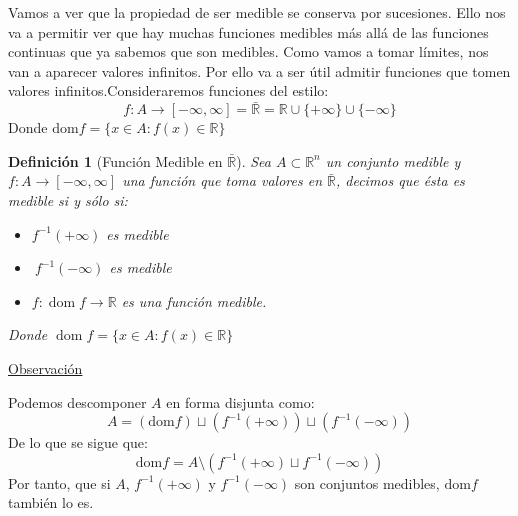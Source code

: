 \documentclass[10pt,a4paper,openright]{book}
\theoremstyle{break}
\newtheorem*{defi}{Definición}
\DeclareMathOperator{\dom}{dom}
\begin{document}
Vamos a ver que la propiedad de ser medible se conserva por sucesiones. Ello nos va a permitir ver que hay muchas funciones medibles
más allá de las funciones continuas que ya sabemos que son medibles.
Como vamos a tomar límites, nos van a aparecer valores infinitos. Por
ello va a ser útil admitir funciones que tomen valores infinitos.Consideraremos funciones del estilo:
$$f: A \rightarrow \left[-\infty, \infty\right] = \bar{\mathbb{R}} = \mathbb{R} \cup \{+\infty\} \cup \{-\infty\}$$
Donde $\mathrm{dom}f = \{x \in A: f\left(x\right) \in \mathbb{R}\}$

\begin{defi}[Función Medible en $\bar{\mathbb{R}}$]
Sea $A \subset \mathbb{R}^n$ un conjunto medible y $f: A \rightarrow \left[-\infty, \infty\right]$ una función que toma valores en $\bar{\mathbb{R}}$, decimos que ésta es medible si y sólo si:
\begin{itemize}
\item $f^{-1}\left(+\infty\right)$ es medible
\item $\ f^{-1}\left(-\infty\right)$ es medible
\item $f : \dom f  \rightarrow \mathbb{R}$ es una función medible.
\end{itemize}
Donde $\dom f = \{x\in A: f(x)\in \mathbb{R}\}$
\end{defi}

\underline{Observación}

Podemos descomponer $A$ en forma disjunta como:
$$A = \left( \mathrm{dom}f \right) \sqcup \left( f^{-1}\left(+\infty\right)\right) \sqcup \left( f^{-1}\left(-\infty\right)\right) $$
De lo que se sigue que:
$$\mathrm{dom}f = A \setminus \left(  f^{-1}\left(+\infty\right) \sqcup  f^{-1}\left(-\infty \right) \right)$$
Por tanto, que si $A$, $f^{-1}\left(+\infty\right)$ y $f^{-1}\left(-\infty\right)$ son conjuntos medibles, $\mathrm{dom}f$ también lo es.
\end{document}
